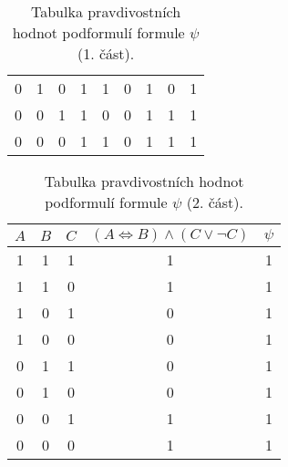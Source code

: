 \begin{example}
\begin{solution}
\begin{table}[h]
\begin{tabular}{|ccc|cccccc|}
            0   & 1   & 0   & 1        & 1        & 0                & 1                 & 0          & 1                             \\
            0   & 0   & 1   & 1        & 0        & 0                & 1                 & 1          & 1                             \\
            0   & 0   & 0   & 1        & 1        & 0                & 1                 & 1          & 1                             \\ \hline
            \end{tabular}
            \caption{Tabulka pravdivostních hodnot podformulí formule $\psi$ (1. část).}
            \label{tab:ex_vyrokova_formule_2_cast_1}
        \end{table}
        \begin{table}[h]
            \centering
            \begin{tabular}{|ccc|cc|}
            \hline
            $A$ & $B$ & $C$ & $(A \iff B) \land (C \lor \neg C)$ & $\psi$ \\ \hline
            1   & 1   & 1   & 1                                  & 1                                                                                       \\
            1   & 1   & 0   & 1                                  & 1                                                                                       \\
            1   & 0   & 1   & 0                                  & 1                                                                                       \\
            1   & 0   & 0   & 0                                  & 1                                                                                       \\
            0   & 1   & 1   & 0                                  & 1                                                                                       \\
            0   & 1   & 0   & 0                                  & 1                                                                                       \\
            0   & 0   & 1   & 1                                  & 1                                                                                       \\
            0   & 0   & 0   & 1                                  & 1                                                                                       \\ \hline
            \end{tabular}
            \caption{Tabulka pravdivostních hodnot podformulí formule $\psi$ (2. část).}
            \label{tab:ex_vyrokova_formule_2_cast_2}
        \end{table}
    \end{solution}
\end{example}
